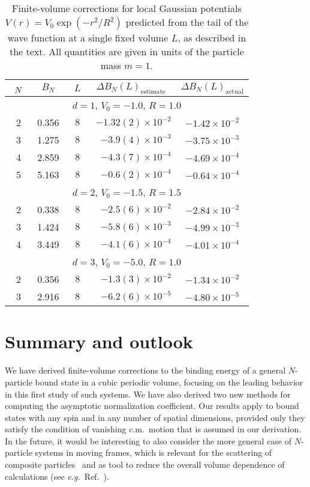 \documentclass[aps,singlecolumn,superscriptaddress,nofootinbib,tightenlines,
preprintnumbers,showkeys]{revtex4-1}
\newcommand{\eg}{\textit{e.g.}}
\newcommand{\ten}[1]{\times10^{#1}}
\begin{document}
\begin{table}[htbp]
\centering
\begin{tabular}{cccrc}
\hline\hline
$\rule{0pt}{1.2em}\phantom{x}N\phantom{x}$
& $B_N$
& $\phantom{x}L\phantom{x}$
& $\Delta B_N(L)_{\text{estimate}}\phantom{x}$
& $\Delta B_N(L)_{\text{actual}}$ \\
\hline\hline
\multicolumn{5}{c}{\rule{0pt}{1.2em}
$d=1$, $V_0 = {-}1.0$, $R = 1.0$} \\
\hline
\rule{0pt}{1.2em}%
2 & 0.356 & $8$ & ${-}1.32(2)\ten{-2}$ & ${-}1.42\ten{-2}$ \\
3 & 1.275 & $8$ & ${-}3.9(4)\ten{-3}$ & ${-}3.75\ten{-3}$ \\
4 & 2.859 & $8$ & ${-}4.3(7)\ten{-4}$ & ${-}4.69\ten{-4}$ \\
5 & 5.163 & $8$ & ${-}0.6(2)\ten{-4}$ & ${-}0.64\ten{-4}$ \\
\hline\hline
\multicolumn{5}{c}{\rule{0pt}{1.2em}
$d=2$, $V_0 = {-}1.5$, $R = 1.5$} \\
\hline
\rule{0pt}{1.2em}%
2 & 0.338 & $8$ & ${-}2.5(6)\ten{-2}$ & ${-}2.84\ten{-2}$ \\
3 & 1.424 & $8$ & ${-}5.8(6)\ten{-3}$ & ${-}4.99\ten{-3}$ \\
4 & 3.449 & $8$ & ${-}4.1(6)\ten{-4}$ & ${-}4.01\ten{-4}$ \\
\hline\hline
\multicolumn{5}{c}{\rule{0pt}{1.2em}
$d=3$, $V_0 = {-}5.0$, $R=1.0$} \\
\hline
\rule{0pt}{1.2em}%
2 & 0.356 & $8$ & ${-}1.3(3)\ten{-2}$ & ${-}1.34\ten{-2}$ \\
3 & 2.916 & $8$ & ${-}6.2(6)\ten{-5}$ & ${-}4.80\ten{-5}$ \\
\hline\hline
\end{tabular}
\caption{Finite-volume corrections for local Gaussian potentials $V(r) = 
V_0\exp(-r^2/R^2)$ predicted from the tail of the wave function 
at a single fixed volume $L$, as described in the text.  All quantities are 
given in units of the particle mass $m=1$.}
\label{tab:Results-Gauss-DeltaB}
\end{table}

\section{Summary and outlook}

We have derived finite-volume corrections to the binding energy of a general
$N$-particle bound state in a cubic periodic volume, focusing on the leading 
behavior in this first study of such systems.  We have also derived two
new methods for computing the asymptotic normalization coefficient.  Our results 
apply to bound states with any spin and in any number of spatial dimensions, 
provided only they satisfy the condition of vanishing c.m.\ motion that is
assumed in our derivation.  In the future, it would be interesting to 
also consider the more general case of $N$-particle systems in moving frames, 
which is relevant for the scattering of composite 
particles~\cite{Bour:2011ef,Rokash:2013xda} and as tool to reduce the overall 
volume dependence of calculations (see \eg~Ref.~\cite{Davoudi:2011md}).
\end{document}
